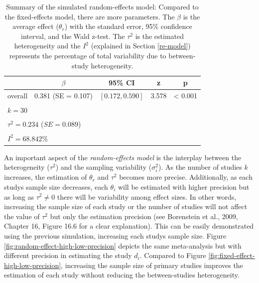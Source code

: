 \documentclass[
  man,floatsintext]{apa6}
\begin{document}
\scriptsize

\begin{table}[H]

\caption{\label{tab:res-random-effect}Summary of the simulated random-effects model: Compared to the fixed-effects model, there are more parameters. The \(\beta\) is the average effect (\(\theta_{r}\)) with the standard error, 95\% confidence interval, and the Wald z-test. The \(\tau^{2}\) is the estimated heterogeneity and the \(I^{2}\) (explained in Section \ref{re-model}) represents the percentage of total variability due to between-study heterogeneity.}
\centering
\fontsize{9}{11}\selectfont
\begin{tabular}[t]{ccccc}
\toprule
 & $\beta$ & 95\% CI & z & p\\
\midrule
overall & 0.381 (SE = 0.107) & $[0.172, 0.590]$ & 3.578 & < 0.001\\
\bottomrule
\multicolumn{5}{l}{\textsuperscript{} $k = 30$}\\
\multicolumn{5}{l}{\textsuperscript{} $\tau^2 = 0.234$ ($SE = 0.089$)}\\
\multicolumn{5}{l}{\textsuperscript{} $I^2 = 68.842\%$}\\
\end{tabular}
\end{table}

\normalsize

An important aspect of the \emph{random-effects model} is the interplay between the heterogeneity (\(\tau^{2}\)) and the sampling variability (\(\sigma_{i}^{2}\)). As the number of studies \(k\) increases, the estimation of \(\theta_{r}\) and \(\tau^{2}\) becomes more precise. Additionally, as each study\textquotesingle s sample size decreases, each \(\theta_{i}\) will be estimated with higher precision but as long as \(\tau^{2} \neq 0\)
there will be variability among effect sizes. In other words, increasing the sample size of each study or the number of studies will not affect the value of \(\tau^{2}\) but only the estimation precision (see Borenstein et al., 2009, Chapter 16, Figure 16.6 for a clear explanation). This can be easily demonstrated using the previous simulation, increasing each study\textquotesingle s sample size. Figure \ref{fig:random-effect-high-low-precision} depicts the same meta-analysis but with different precision in estimating the study \(d_{i}\). Compared to Figure \ref{fig:fixed-effect-high-low-precision}, increasing the sample size of primary studies improves the estimation of each study without reducing the between-studies heterogeneity.
\end{document}
